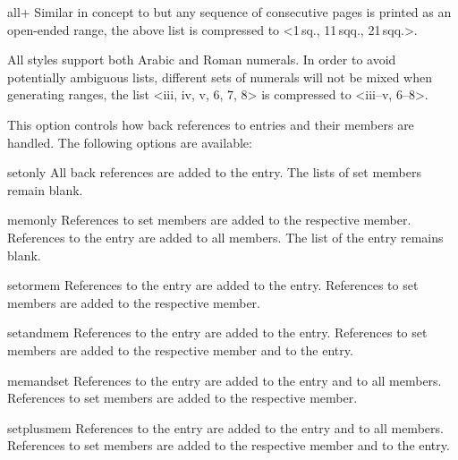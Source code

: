 \documentclass{ltxdockit}[2011/03/25]
\begin{document}
\begin{optionlist}
\begin{valuelist}
\item[all+] Similar in concept to  but any sequence of consecutive pages is printed as an open-ended range, \eg the above list is compressed to <1\,sq., 11\,sqq., 21\,sqq.>.

\end{valuelist}

All styles support both Arabic and Roman numerals. In order to avoid potentially ambiguous lists, different sets of numerals will not be mixed when generating ranges, \eg the list <iii, iv, v, 6, 7, 8> is compressed to <iii--v, 6--8>.


This option controls how back references to  entries and their members are handled. The following options are available:

\begin{valuelist}

\item[setonly] All back references are added to the  entry. The  lists of set members remain blank.

\item[memonly] References to set members are added to the respective member. References to the  entry are added to all members. The  list of the  entry remains blank.

\item[setormem] References to the  entry are added to the  entry. References to set members are added to the respective member.

\item[setandmem] References to the  entry are added to the  entry. References to set members are added to the respective member and to the  entry.

\item[memandset] References to the  entry are added to the  entry and to all members. References to set members are added to the respective member.

\item[setplusmem] References to the  entry are added to the  entry and to all members. References to set members are added to the respective member and to the  entry.


\end{valuelist}
\end{optionlist}
\end{document}
